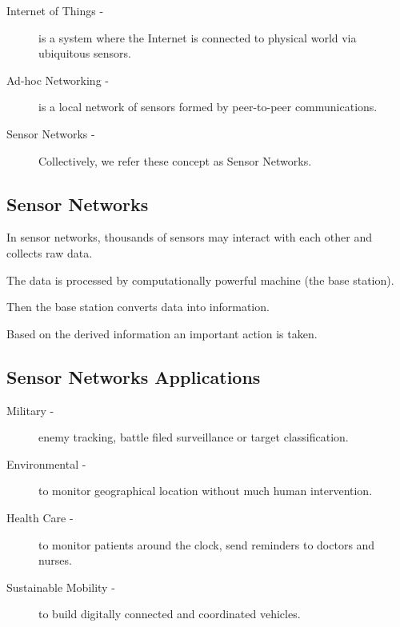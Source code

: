 \documentclass[%
  slidesonly,%
  semlayer%
  ]{seminar}                                  %
\begin{document}
\begin{slide}
\begin{description}
    \item[Internet of Things -] is a system where the Internet is connected to physical world via ubiquitous sensors.
    
    \item[Ad-hoc Networking -] is a local network of sensors formed by peer-to-peer communications.
    
    \item[Sensor Networks -] Collectively, we refer these concept as Sensor Networks.
  \end{description}
  \vfill
  \clearpage

  \subsection*{Sensor Networks}
    \vfill  
    In sensor networks, thousands of sensors may interact with each other and collects raw data.

    The data is processed by computationally powerful machine (the base station).

    Then the base station converts data into information.

    Based on the derived information an important action is taken.

    \vfill
    \clearpage

  \subsection*{Sensor Networks Applications}
    \vfill
    \begin{description}
    \item[Military -] enemy tracking, battle filed surveillance or target classification.

    \item[Environmental -] to monitor geographical location without much human intervention.
    
    \item[Health Care -]  to monitor patients around the clock, send reminders to doctors and nurses.
  
    \item[Sustainable Mobility -] to build digitally connected and coordinated vehicles.
    \end{description}
    \vfill
    \clearpage


\end{slide}
\end{document}
